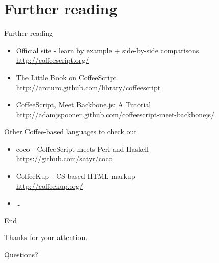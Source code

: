 \documentclass[xcolor=dvipsnames]{beamer}
\newcommand{\slide}[1]{\begin{frame}[fragile]{{#1}}}
\begin{document}
\section{Further reading}
\slide{Further reading}
    \begin{itemize}
        \item Official site - learn by example + side-by-side comparisons \\
            \url{http://coffeescript.org/}
        \item The Little Book on CoffeeScript \\
            \url{http://arcturo.github.com/library/coffeescript}
        \item CoffeeScript, Meet Backbone.js: A Tutorial \\
            \url{http://adamjspooner.github.com/coffeescript-meet-backbonejs/}
    \end{itemize}

    Other Coffee-based languages to check out
    \begin{itemize}
        \item coco - CoffeeScript meets Perl and Haskell \\
            \url{https://github.com/satyr/coco}
        \item CoffeeKup - CS based HTML markup \\
            \url{http://coffeekup.org/}
        \item \ldots
    \end{itemize}
\end{frame}


\slide{End}
    \begin{center}
        Thanks for your attention.
        
        \vspace{2 cm}
        \pause
        Questions?
    \end{center}
\end{frame}
\end{document}
